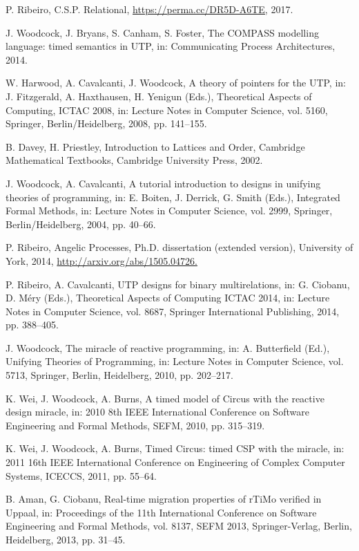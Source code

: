 \documentclass[11pt]{article}
\begin{document}
\begin{enumerate}[label={[\arabic*]}, leftmargin=*, itemsep=0.4em]
\item P. Ribeiro, C.S.P. Relational, \url{https://perma.cc/DR5D-A6TE,} 2017.
\item J. Woodcock, J. Bryans, S. Canham, S. Foster, The COMPASS modelling language: timed semantics in UTP, in: Communicating Process Architectures, 2014.
\item W. Harwood, A. Cavalcanti, J. Woodcock, A theory of pointers for the UTP, in: J. Fitzgerald, A. Haxthausen, H. Yenigun (Eds.), Theoretical Aspects of Computing, ICTAC 2008, in: Lecture Notes in Computer Science, vol. 5160, Springer, Berlin/Heidelberg, 2008, pp. 141–155.
\item B. Davey, H. Priestley, Introduction to Lattices and Order, Cambridge Mathematical Textbooks, Cambridge University Press, 2002.
\item J. Woodcock, A. Cavalcanti, A tutorial introduction to designs in unifying theories of programming, in: E. Boiten, J. Derrick, G. Smith (Eds.), Integrated Formal Methods, in: Lecture Notes in Computer Science, vol. 2999, Springer, Berlin/Heidelberg, 2004, pp. 40–66.
\item P. Ribeiro, Angelic Processes, Ph.D. dissertation (extended version), University of York, 2014, \url{http://arxiv.org/abs/1505.04726.}
\item P. Ribeiro, A. Cavalcanti, UTP designs for binary multirelations, in: G. Ciobanu, D. Méry (Eds.), Theoretical Aspects of Computing ICTAC 2014, in: Lecture Notes in Computer Science, vol. 8687, Springer International Publishing, 2014, pp. 388–405.
\item J. Woodcock, The miracle of reactive programming, in: A. Butterfield (Ed.), Unifying Theories of Programming, in: Lecture Notes in Computer Science, vol. 5713, Springer, Berlin, Heidelberg, 2010, pp. 202–217.
\item K. Wei, J. Woodcock, A. Burns, A timed model of Circus with the reactive design miracle, in: 2010 8th IEEE International Conference on Software Engineering and Formal Methods, SEFM, 2010, pp. 315–319.
\item K. Wei, J. Woodcock, A. Burns, Timed Circus: timed CSP with the miracle, in: 2011 16th IEEE International Conference on Engineering of Complex Computer Systems, ICECCS, 2011, pp. 55–64.
\item B. Aman, G. Ciobanu, Real-time migration properties of rTiMo verified in Uppaal, in: Proceedings of the 11th International Conference on Software Engineering and Formal Methods, vol. 8137, SEFM 2013, Springer-Verlag, Berlin, Heidelberg, 2013, pp. 31–45.

\end{enumerate}
\end{document}
